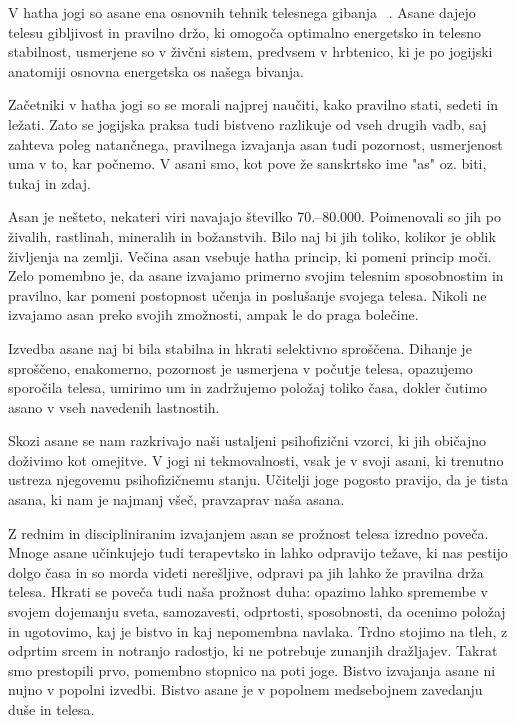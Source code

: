 \documentclass[a4paper, 12pt]{book}
\begin{document}
V hatha jogi so asane ena osnovnih tehnik telesnega gibanja  ~\cite{Asane}. Asane dajejo telesu gibljivost in pravilno držo, ki omogoča optimalno energetsko in telesno stabilnost, usmerjene so v živčni sistem, predvsem v hrbtenico, ki je po jogijski anatomiji osnovna energetska os našega bivanja.

Začetniki v hatha jogi so se morali najprej naučiti, kako pravilno stati, sedeti in ležati. Zato se jogijska praksa tudi bistveno razlikuje od vseh drugih vadb, saj zahteva poleg natančnega, pravilnega izvajanja asan tudi pozornost, usmerjenost uma v to, kar počnemo. V asani smo, kot pove že sanskrtsko ime "as" oz. biti, tukaj in zdaj.

Asan je nešteto, nekateri viri navajajo številko 70.–80.000. Poimenovali so jih po živalih, rastlinah, mineralih in  božanstvih. Bilo naj bi jih toliko, kolikor je oblik življenja na zemlji. Večina asan vsebuje hatha princip, ki pomeni princip moči. Zelo pomembno je, da asane izvajamo primerno svojim telesnim sposobnostim in pravilno, kar pomeni postopnost učenja in poslušanje svojega telesa. Nikoli ne izvajamo asan preko svojih zmožnosti, ampak le do praga bolečine. 

Izvedba asane naj bi bila stabilna in hkrati selektivno sproščena. Dihanje je sproščeno, enakomerno, pozornost je usmerjena v počutje telesa, opazujemo sporočila telesa, umirimo um in zadržujemo položaj toliko časa, dokler čutimo asano v vseh navedenih lastnostih. 

Skozi asane se nam razkrivajo naši ustaljeni psihofizični vzorci, ki jih običajno doživimo kot omejitve. V jogi ni tekmovalnosti, vsak je v svoji asani, ki trenutno ustreza njegovemu psihofizičnemu stanju. Učitelji joge pogosto pravijo, da je tista asana, ki nam je najmanj všeč, pravzaprav naša asana.

Z rednim in discipliniranim izvajanjem asan se prožnost telesa izredno poveča. Mnoge asane učinkujejo tudi terapevtsko in lahko odpravijo težave, ki nas pestijo dolgo časa in so morda videti nerešljive, odpravi pa jih lahko že pravilna drža telesa. Hkrati se poveča tudi naša prožnost duha: opazimo lahko spremembe v svojem dojemanju sveta, samozavesti, odprtosti, sposobnosti, da ocenimo položaj in ugotovimo, kaj je bistvo in kaj nepomembna navlaka. Trdno stojimo na tleh, z odprtim srcem in notranjo radostjo, ki ne potrebuje zunanjih dražljajev. Takrat smo prestopili prvo, pomembno stopnico na poti joge.
Bistvo izvajanja asane ni nujno v popolni izvedbi. Bistvo asane je v popolnem medsebojnem zavedanju duše in telesa.
\end{document}
